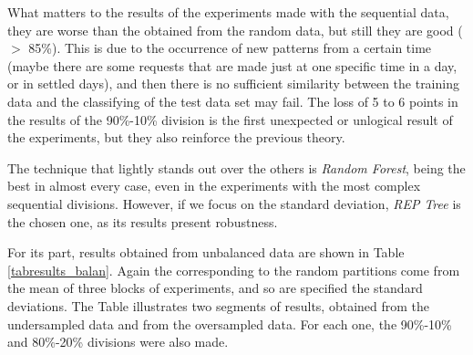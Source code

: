 \documentclass{llncs}
\begin{document}
What matters to the results of the experiments made with the sequential data, they are worse than the obtained from the random data, but still they are good ($>$ 85\%). This is due to the occurrence of new patterns from a certain time (maybe there are some requests that are made just at one specific time in a day, or in settled days), and then there is no sufficient similarity between the training data and the classifying of the test data set may fail. The loss of 5 to 6 points in the results of the 90\%-10\% division is the first unexpected or unlogical result of the experiments, but they also reinforce the previous theory.

The technique that lightly stands out over the others is
\textit{Random Forest}, being the best in almost every case, even in
the experiments with the most complex sequential divisions. However,
if we focus on the standard deviation, \textit{REP Tree} is the chosen
one, as its results present robustness. 

For its part, results obtained from unbalanced data are shown in Table \ref{tabresults_balan}. Again the corresponding to the random partitions come from the mean of three blocks of experiments, and so are specified the standard deviations. The Table illustrates two segments of results, obtained from the undersampled data and from the oversampled data. For each one, the 90\%-10\% and 80\%-20\% divisions were also made.

% 
% 
% 
% 
% 
\end{document}
